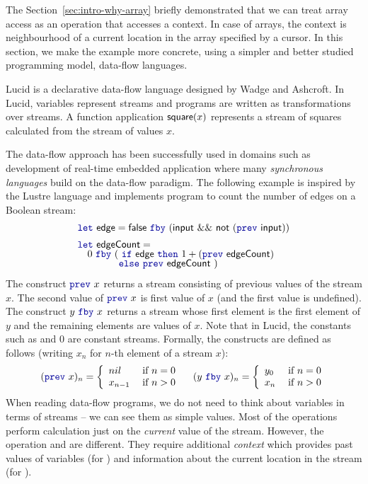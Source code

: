 The Section~\ref{sec:intro-why-array} briefly demonstrated that we can treat array access as an 
operation that accesses a context. In case of arrays, the context is neighbourhood of a current
location in the array specified by a cursor. In this section, we make the example more concrete,
using a simpler and better studied programming model, data-flow languages.

Lucid \cite{app-lucid} is a declarative data-flow language designed by Wadge and Ashcroft. In Lucid, 
variables represent streams and programs are written as transformations over streams. A function 
application $\textnormal{\sffamily square}(x)$ represents a stream of squares calculated from the stream of values $x$.

The data-flow approach has been successfully used in domains such as development of real-time embedded 
application where many \emph{synchronous languages} \cite{app-synchronous-lang} build on the data-flow
paradigm. The following example is inspired by the Lustre \cite{app-synchronous-lustre} language
and implements program to count the number of edges on a Boolean stream:
%
\begin{equation*}
\begin{array}{l}
\kvd{let}~\ident{edge} = \ident{false}~\kvd{fby}~(\ident{input}~\&\&~\ident{not}~(\kvd{prev}~\ident{input}))
\\[0.5em]
\kvd{let}~\ident{edgeCount} = \\[-0.25em]
\quad 0~\kvd{fby}~ (~\kvd{if}~\ident{edge}~\kvd{then}~1 + (\kvd{prev}~\ident{edgeCount})\\[-0.25em]
\quad\quad\quad~~~\, \kvd{else}~\kvd{prev}~\ident{edgeCount} ~)
\end{array}
\end{equation*}
%
The construct $\kvd{prev}~x$ returns a stream consisting of previous values of the stream 
$x$. The second value of $\kvd{prev}~x$ is first value of $x$ (and the first
value is undefined). The construct $y~\kvd{fby}~x$ returns a stream whose first element is the 
first element of $y$ and the remaining elements are values of $x$. Note that in Lucid, the constants
such as  and $0$ are constant streams. Formally, the constructs are defined as follows
(writing $x_n$ for $n$-th element of a stream $x$):
%
\[ 
(\kvd{prev}~x)_n = \left\{ 
  \begin{array}{ll}
    nil     & \; \text{if $n=0$}\\
    x_{n-1} & \; \text{if $n>0$}
  \end{array} \right.
\quad
(y~\kvd{fby}~x)_n = \left\{ 
  \begin{array}{ll}
    y_0     & \; \text{if $n=0$}\\
    x_n     & \; \text{if $n>0$}
  \end{array} \right.
\]  
%
When reading data-flow programs, we do not need to think about variables in terms of streams --
we can see them as simple values. Most of the operations perform calculation just on the 
\emph{current} value of the stream. However, the operation  and  are different.
They require additional \emph{context} which provides past values of variables
(for ) and information about the current location in the stream (for ). 

